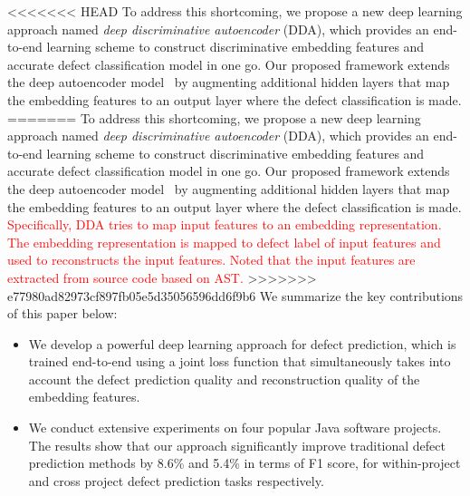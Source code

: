 <<<<<<< HEAD
To address this shortcoming, we propose a new deep learning approach named \emph{deep discriminative autoencoder} (DDA), which provides an end-to-end learning scheme to construct discriminative embedding features and accurate defect classification model in one go. Our proposed framework extends the deep autoencoder model~\cite{Vincent2010} by augmenting additional hidden layers that map the embedding features to an output layer where the defect classification is made.
=======
To address this shortcoming, we propose a new deep learning approach named \emph{deep discriminative autoencoder} (DDA), which provides an end-to-end learning scheme to construct discriminative embedding features and accurate defect classification model in one go. Our proposed framework extends the deep autoencoder model~\cite{ng2011sparse} by augmenting additional hidden layers that map the embedding features to an output layer where the defect classification is made. \textcolor{red}{Specifically, DDA tries to map input features to an embedding representation. The embedding representation is mapped to defect label of input features and used to reconstructs the input features. Noted that the input features are extracted from source code based on AST.}
>>>>>>> e77980ad82973cf897fb05e5d35056596dd6f9b6
We summarize the key contributions of this paper below:
\begin{itemize}
	\item We develop a powerful deep learning approach for defect prediction, which is trained end-to-end using a joint loss function that simultaneously takes into account the defect prediction quality and reconstruction quality of the embedding features.
	\item We conduct extensive experiments on four popular Java software projects. The results show that our approach significantly improve traditional defect prediction methods by 8.6\% and 5.4\% in terms of F1 score, for within-project and cross project defect prediction tasks respectively. 
\end{itemize}

